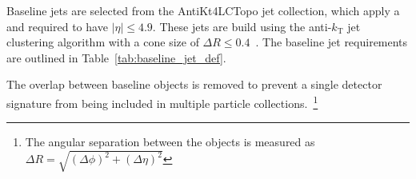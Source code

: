 \begin{table}[ht]
  \caption{
    Baseline muon requirements.
  }
  \label{tab:baseline_mu_def}
\end{table}

Baseline jets are selected from the AntiKt4LCTopo jet collection, which apply a
and required to have $|\eta| \leq 4.9$.
These jets are build using the anti-$k_\mathrm{T}$ jet clustering algorithm
with a cone size of $\Delta R \leq 0.4$~\cite{Cacciari:2008gp}.
The baseline jet requirements are outlined in Table~\ref{tab:baseline_jet_def}.

\begin{table}[ht]
  \caption{
    Baseline jet requirements.
  }
  \label{tab:baseline_jet_def}
\end{table}

The overlap between baseline objects is removed to prevent a single
detector signature from being included in multiple particle
collections.~\footnote{The angular separation between the objects is measured
as $\Delta R = \sqrt{(\Delta \phi)^2 + (\Delta \eta)^2}$}

